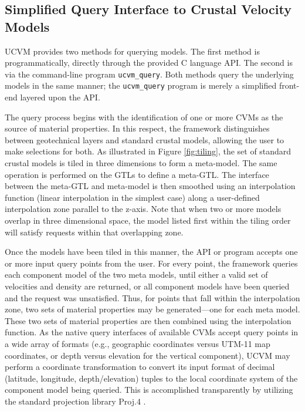 


\subsection{Simplified Query Interface to Crustal Velocity Models}
\label{sec:querying}

UCVM provides two methods for querying models. The first method is programmatically, directly through the provided C language API. The second is via the command-line program \texttt{ucvm\_query}. Both methods query the underlying models in the same manner; the \texttt{ucvm\_query} program is merely a simplified front-end layered upon the API.

The query process begins with the identification of one or more CVMs as the source of material properties. In this respect, the framework distinguishes between geotechnical layers and standard crustal models, allowing the user to make selections for both. As illustrated in Figure \ref{fig:tiling}, the set of standard crustal models is tiled in three dimensions to form a meta-model. The same operation is performed on the GTLs to define a meta-GTL. The interface between the meta-GTL and meta-model is then smoothed using an interpolation function (linear interpolation in the simplest case) along a user-defined interpolation zone parallel to the z-axis. Note that when two or more models overlap in three dimensional space, the model listed first within the tiling order will satisfy requests within that overlapping zone.

Once the models have been tiled in this manner, the API or program accepts one or more input query points from the user. For every point, the framework queries each component model of the two meta models, until either a valid set of velocities and density are returned, or all component models have been queried and the request was unsatisfied. Thus, for points that fall within the interpolation zone, two sets of material properties may be generated---one for each meta model. These two sets of material properties are then combined using the interpolation function. As the native query interfaces of available CVMs accept query points in a wide array of formats (e.g., geographic coordinates versus UTM-11 map coordinates, or depth versus elevation for the vertical component), UCVM may perform a coordinate transformation to convert its input format of decimal (latitude, longitude, depth/elevation) tuples to the local coordinate system of the component model being queried. This is accomplished transparently by utilizing the standard projection library Proj.4 \citep{Evenden_2003_Manual}.


